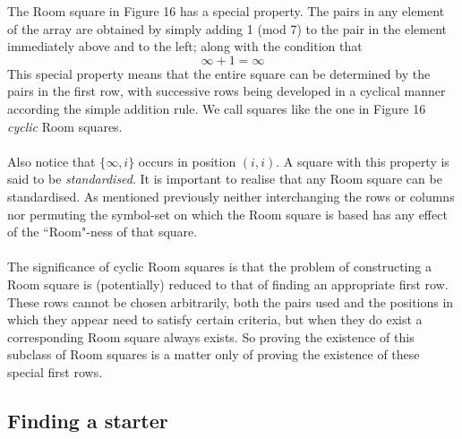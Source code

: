 \documentclass[
  12pt,
  a4paper]{book}
\begin{document}
The Room square in Figure 16 has a special property. The pairs in any
element of the array are obtained by simply adding 1 (mod 7) to the pair
in the element immediately above and to the left; along with the
condition that \[\infty+1 = \infty\] This special property means that
the entire square can be determined by the pairs in the first row, with
successive rows being developed in a cyclical manner according the
simple addition rule. We call squares like the one in Figure 16 \emph{cyclic}
Room squares.\\
~\\
Also notice that \(\{\infty,i\}\) occurs in position \((i,i)\). A square
with this property is said to be \emph{standardised}. It is important to
realise that any Room square can be standardised. As mentioned
previously neither interchanging the rows or columns nor permuting the
symbol-set on which the Room square is based has any effect of the
``Room"-ness of that square.\\
~\\
The significance of cyclic Room squares is that the problem of
constructing a Room square is (potentially) reduced to that of finding
an appropriate first row. These rows cannot be chosen arbitrarily, both
the pairs used and the positions in which they appear need to satisfy
certain criteria, but when they do exist a corresponding Room square
always exists. So proving the existence of this subclass of Room squares
is a matter only of proving the existence of these special first rows.

\hypertarget{finding-a-starter}{%
\subsection{Finding a starter}\label{finding-a-starter}}
\end{document}
